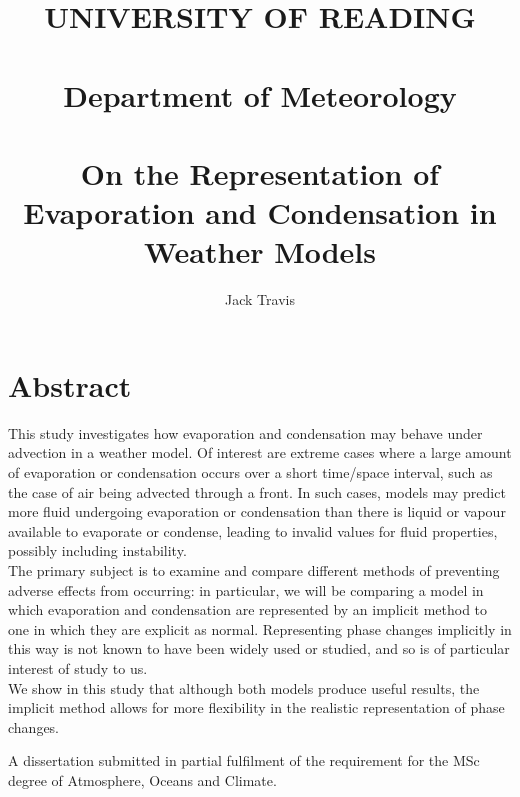 \documentclass[11pt]{article}
\begin{document}
\thispagestyle{empty}
\title{UNIVERSITY OF READING\\
~\\
Department of Meteorology\\
~\\
On the Representation of Evaporation and Condensation in Weather Models}
\author{Jack Travis}
\maketitle

\section{Abstract}
This study investigates how evaporation and condensation may behave under advection in a weather model. Of interest are extreme cases where a large amount of evaporation or condensation occurs over a short time/space interval, such as the case of air being advected through a front. In such cases, models may predict more fluid undergoing evaporation or condensation than there is liquid or vapour available to evaporate or condense, leading to invalid values for fluid properties, possibly including instability. \\
The primary subject is to examine and compare different methods of preventing adverse effects from occurring: in particular, we will be comparing a model in which evaporation and condensation are represented by an implicit method to one in which they are explicit as normal. Representing phase changes implicitly in this way is not known to have been widely used or studied, and so is of particular interest of study to us. \\
We show in this study that although both models produce useful results, the implicit method allows for more flexibility in the realistic representation of phase changes.

\null \vfill
A dissertation submitted in partial fulfilment of the requirement for the MSc degree of Atmosphere, Oceans and Climate.

\newpage
\tableofcontents

\newpage
\end{document}
